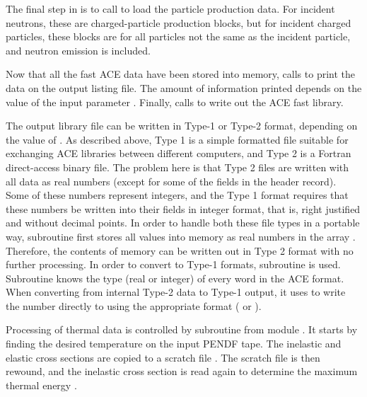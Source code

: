 The final step in  is to call 
 to load the particle production data.
For incident neutrons, these are charged-particle production
blocks, but for incident charged particles, these blocks are
for all particles not the same as the incident particle, and
neutron emission is included.

Now that all the fast ACE data have been stored into memory,
 calls 
to print the data on the output listing file.  The amount of
information printed depends on the value of the input parameter
.  Finally,  calls
 to write out the
ACE fast library.

The output library file can be written in Type-1 or Type-2 format,
depending on the value of .  As described above,
Type 1 is a simple formatted file suitable for exchanging ACE
libraries between different computers, and Type 2 is a Fortran
direct-access binary file.  The problem here is that Type 2
files are written with all data as real numbers (except
for some of the fields in the header record).  Some of these
numbers represent integers, and the Type 1 format requires that
these numbers be written into their fields in integer format,
that is, right justified and without decimal points. In order to
handle both these file types in a portable way, subroutine
 first stores all values into memory as real numbers
in the array .  Therefore, the contents of memory can be
written out in Type 2 format with no further processing.  In order
to convert to Type-1 formats, subroutine 
 is used.  Subroutine 
knows the type (real or integer) of every word in the ACE format.
When converting from internal Type-2 data to Type-1 output, it
uses  to write the number
directly to  using the appropriate format (
or ).

Processing of thermal data is controlled by subroutine
 from module
.
It starts by finding the desired temperature on the input PENDF
tape.  The inelastic and elastic cross sections are copied
to a scratch file .  The scratch file is then rewound,
and the inelastic cross section is read again to determine the
maximum thermal energy .

